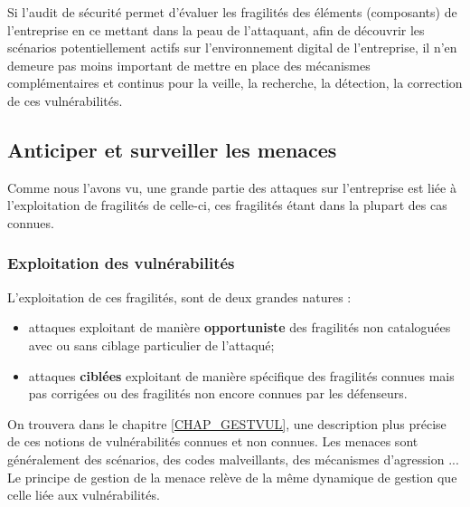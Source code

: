 Si l'audit de sécurité permet d'évaluer les fragilités des éléments (composants) de l'entreprise en ce mettant dans la peau de l'attaquant, afin de découvrir les scénarios potentiellement actifs sur l'environnement digital de l'entreprise, il n'en demeure pas moins important de mettre en place des mécanismes complémentaires et continus pour la veille, la recherche, la détection, la correction de ces vulnérabilités.


\subsection{Anticiper et surveiller les menaces }

Comme nous l'avons vu, une grande partie des attaques sur l'entreprise est liée à l'exploitation de fragilités de celle-ci, ces fragilités étant dans la plupart des cas connues.  

\begin{frame}
\frametitle<presentation>{Exploitation des vulnérabilités}
L'exploitation de ces fragilités, sont de deux grandes natures :
\begin{itemize}
	\item attaques exploitant de manière \textbf{opportuniste} des fragilités non cataloguées  avec ou sans ciblage particulier de l'attaqué;
	\item attaques \textbf{ciblées} exploitant de manière spécifique des fragilités connues mais pas corrigées ou des fragilités non encore connues par les défenseurs.
\end{itemize}
\end{frame}

On trouvera dans le chapitre \ref{CHAP_GESTVUL}, une description plus précise de ces notions de vulnérabilités connues et non connues. Les menaces sont généralement des scénarios, des codes malveillants, des mécanismes d'agression ...
Le principe de gestion de la menace relève de la même dynamique de gestion que celle liée aux vulnérabilités. 


